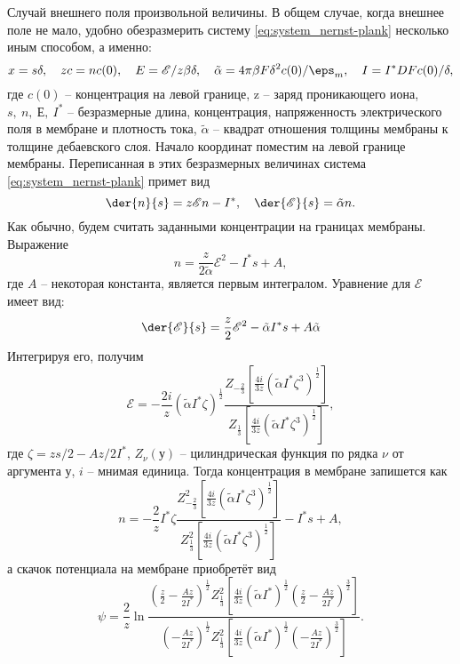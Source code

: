 Случай внешнего поля произвольной величины. В общем случае, когда внешнее поле
не мало, удобно обезразмерить систему \eqref{eq:system_nernst-plank} несколько
иным способом, а именно:
\[
    x = s\delta,\quad zc = nc(0),\quad E = \mathscr{E}/z\beta\delta,\quad
    \tilde{\alpha} = 4\pi\beta F\delta^2c(0) / \eps_m,\quad
    I = I^*DFc(0)/\delta,
\]
где \( c(0) \) -- концентрация на левой границе, z -- заряд проникающего иона,
\( s,\ n,\ \mathscr{Е},\ I^* \) -- безразмерные длина, концентрация,
напряженность электрического поля в мембране и плотность тока,
\( \tilde{\alpha} \) -- квадрат отношения толщины мембраны к толщине дебаевского
слоя. Начало координат поместим на левой границе мембраны. Переписанная в этих
безразмерных величинах система \eqref{eq:system_nernst-plank} примет вид
\begin{equation}
    \der{n}{s} = z\mathscr{E}n - I^*,\quad
    \der{\mathscr{E}}{s} = \tilde{\alpha}n.
\end{equation}
Как обычно, будем считать заданными концентрации на границах мембраны. Выражение
\begin{equation}
    n = \frac{z}{2\tilde{\alpha}}\mathscr{E}^2 - I^*s + A,
\end{equation}
где \( A \) -- некоторая константа, является первым интегралом. Уравнение для
\( \mathscr{E} \) имеет вид:
\begin{equation}
    \der{\mathscr{E}}{s} = \frac{z}{2}\mathscr{E}^2 - \tilde{\alpha}I^*s +
    A\tilde{\alpha}
\end{equation}
Интегрируя его, получим
\begin{equation}
    \mathscr{E} = -\frac{2i}{z}(\tilde{\alpha}I^*\zeta)^\frac{1}{2}
    \frac{Z_{-\frac{2}{3}}\left[
        \frac{4i}{3z}(\tilde{\alpha}I^*\zeta^3)^\frac{1}{2}\right]}
        {Z_\frac{1}{3}\left[
        \frac{4i}{3z}(\tilde{\alpha}I^*\zeta^3)^\frac{1}{2}\right]},
\end{equation}
где \( \zeta = zs/2 - Az/2I^* \), \( Z_\nu(у) \) -- цилиндрическая функция по
рядка \( \nu \) от аргумента \(у\), \(i\) -- мнимая единица. Тогда концентрация
в мембране запишется как
\begin{equation}
    n = -\frac{2}{z} I^*\zeta\frac{Z_{-\frac{2}{3}}^2\left[
        \frac{4i}{3z}(\tilde{\alpha}I^*\zeta^3)^\frac{1}{2}\right]}
        {Z_\frac{1}{3}^2\left[
        \frac{4i}{3z}(\tilde{\alpha}I^*\zeta^3)^\frac{1}{2}\right]} - I^*s + A,
\end{equation}
а скачок потенциала на мембране приобретёт вид
\begin{equation}
    \psi = \frac{2}{z}\ln
        \frac{\left(\frac{z}{2} - \frac{Az}{2I^*}\right)^\frac{1}{2}
            Z_\frac{1}{3}^2\left[
            \frac{4i}{3z}(\tilde{\alpha}I^*)^\frac{1}{2}
            \left(\frac{z}{2} - \frac{Az}{2I^*}\right)^\frac{3}{2}\right]}
            {\left(-\frac{Az}{2I^*}\right)^\frac{1}{2}
            Z_\frac{1}{3}^2\left[
            \frac{4i}{3z}(\tilde{\alpha}I^*)^\frac{1}{2}
            \left(-\frac{Az}{2I^*}\right)^\frac{3}{2}\right]}.
\end{equation}

